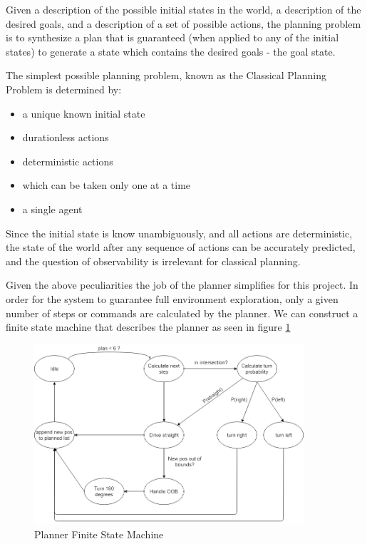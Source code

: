 \noindent Given a description of the possible initial states in the world, a description of the desired goals, and a description of a set of possible actions, the planning problem is to synthesize a plan that is guaranteed (when applied to any of the initial states) to generate a state which contains the desired goals - the goal state. 

\noindent The simplest possible planning problem, known as the Classical Planning Problem is determined by:
\begin{itemize}
    \item a unique known initial state
    \item durationless actions
    \item deterministic actions
    \item which can be taken only one at a time
    \item a single agent
\end{itemize}

\noindent Since the initial state is know unambiguously, and all actions are deterministic, the state of the world after any sequence of actions can be accurately predicted, and the question of observability is irrelevant for classical planning. 

\noindent Given the above peculiarities the job of the planner simplifies for this project. In order for the system to guarantee full environment exploration, only a given number of steps or commands are calculated by the planner. We can construct a finite state machine that describes the planner as seen in figure \ref{fig:planner-state-machine}

\begin{figure}[H]
\centering
\includegraphics[width=10cm]{figs/Planner-State-Machine.png}
\caption{Planner Finite State Machine}
\label{fig:planner-state-machine}
\end{figure}

